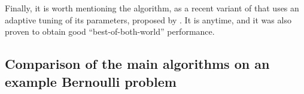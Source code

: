 %



Finally, it is worth mentioning the \Exppp{} algorithm, as a recent variant of \ExpThree{} that uses an adaptive tuning of its parameters, proposed by \cite{Seldin17}.
It is anytime, and it was also proven to obtain good ``best-of-both-world'' performance.


\subsection{Comparison of the main algorithms on an example Bernoulli problem}
\label{sub:2:shortNumericalExperiments}

